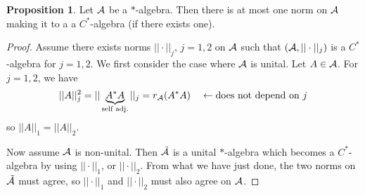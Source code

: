 \documentclass[10pt,english,a4paper]{article}
\theoremstyle{definition}
\newtheorem*{proposition}{Proposition}
\begin{document}
\begin{proposition}
    Let $\mathcal{A}$ be a $*$-algebra. Then there is at most one norm on $\mathcal{A}$ making
it to a a $C^*$-algebra (if there exists one).
\end{proposition}
\begin{proof}
    Assume there exists norms $||\cdot||_{j}$, $j =1,2$ on $\mathcal{A}$ 
such that $(\mathcal{A},||\cdot||_{j})$ is a $C^*$-algebra for $j=1,2$.
We first consider the case where $\mathcal{A}$ is unital. Let $A \in \mathcal{A}$. For
$j=1,2$, we have 
\[
||A||_{j}^{2} = ||\underbrace{A^*A}_{\text{self adj.}}
||_{j} = r_{\mathcal{A}}(A^*A) \quad \leftarrow\text{does not depend on $j$}
\]
so $||A||_1 = ||A||_2$.

Now assume $\mathcal{A}$ is non-unital. Then $\tilde{\mathcal{A}}$ is a unital $*$-algebra which
becomes a $C^*$-algebra by using $||\cdot||_1$, or $||\cdot||_2$. From what we 
have just done, the two norms on $\tilde{\mathcal{A}}$ must agree, so $||\cdot||_1$ and 
$||\cdot||_2$ must also agree on $\mathcal{A}$.
\end{proof}
\end{document}
